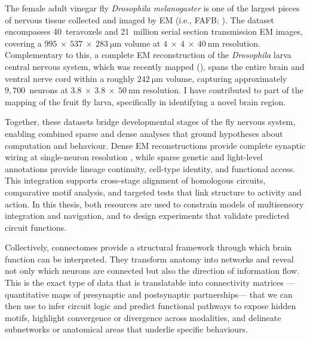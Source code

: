 The female adult vinegar fly \textit{Drosophila melanogaster} is one of the largest pieces of nervous tissue collected and imaged by EM (i.e., FAFB; \citep{zheng2018complete}). The dataset encompasses 40~teravoxels and 21~million serial section transmission EM images, covering a $995~\times~537~\times~283~\si{\micro\metre}$ volume at $4~\times~4~\times~40~\si{\nano\metre}$ resolution. Complementary to this, a complete EM reconstruction of the \textit{Drosophila} larva central nervous system, which was recently mapped (\citep{winding2023connectome}), spans the entire brain and ventral nerve cord within a roughly $242~\si{\micro\metre}$ volume, capturing approximately $9{,}700$~neurons at $3.8~\times~3.8~\times~50~\si{\nano\metre}$ resolution. 
I have contributed to part of the mapping of the fruit fly larva, specifically in identifying a novel brain region. 


Together, these datasets bridge developmental stages of the fly nervous system, enabling combined sparse and dense analyses that ground hypotheses about computation and behaviour. Dense EM reconstructions provide complete synaptic wiring at single-neuron resolution \citep{dorkenwald2024neuronal,winding2023connectome}, while sparse genetic and light-level annotations provide lineage continuity, cell-type identity, and functional access. This integration supports cross-stage alignment of homologous circuits, comparative motif analysis, and targeted tests that link structure to activity and action. In this thesis, both resources are used to constrain models of multisensory integration and navigation, and to design experiments that validate predicted circuit functions.

Collectively, connectomes provide a structural framework through which brain function can be interpreted. They transform anatomy into networks and reveal not only which neurons are connected but also the direction of information flow. This is the exact type of data that is translatable into connectivity matrices — quantitative maps of presynaptic and postsynaptic partnerships— that we can then use to infer circuit logic and predict functional pathways to expose hidden motifs, highlight convergence or divergence across modalities, and delineate subnetworks or anatomical areas that underlie specific behaviours. 

